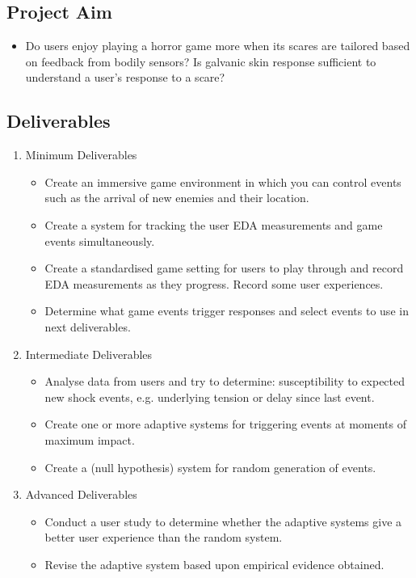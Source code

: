 \documentclass[12pt,a4paper]{article}
\begin{document}
\subsection{Project Aim}
\begin{itemize}
	\item Do users enjoy playing a horror game more when its scares are tailored based on feedback from bodily sensors? Is galvanic skin response sufficient to understand a user's response to a scare?
\end{itemize}

\subsection{Deliverables}
\begin{enumerate}
	\item Minimum Deliverables
	\begin{itemize}
		\item Create an immersive game environment in which you can control events such as the arrival of new enemies and their location.
		\item Create a system for tracking the user EDA measurements and game events simultaneously.
		\item Create a standardised game setting for users to play through and record EDA measurements as they progress. Record some user experiences.
		\item Determine what game events trigger responses and select events to use in next deliverables.
	\end{itemize}
	
	\item Intermediate Deliverables
	\begin{itemize}
		\item Analyse data from users and try to determine: susceptibility to expected new shock events, e.g. underlying tension or delay since last event.
		\item Create one or more adaptive systems for triggering events at moments of maximum impact.
		\item Create a (null hypothesis) system for random generation of events.
	\end{itemize}
	
	\item Advanced Deliverables
	\begin{itemize}
		\item Conduct a user study to determine whether the adaptive systems give a better user experience than the random system.
		\item Revise the adaptive system based upon empirical evidence obtained.
	\end{itemize}
\end{enumerate}
\end{document}
